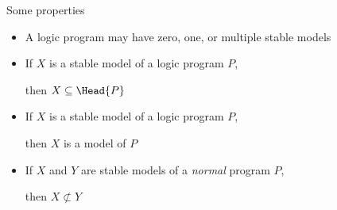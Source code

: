 \begin{frame}{Some properties}
  \bigskip
  \begin{itemize}
  \item<1-> A logic program may have zero, one, or multiple stable models
    \medskip
    \medskip
  \item<3-> If $X$ is a stable model of a logic program $P$,

    then $X\subseteq\Head{P}$
    \medskip
  \item<3-> If $X$ is a stable model of a logic program $P$,

    then $X$ is a model of $P$
    \medskip
  \item<4-> If $X$ and $Y$ are stable models of a \emph{normal} program $P$,

    then $X\not\subset Y$
  \end{itemize}
\end{frame}
%
